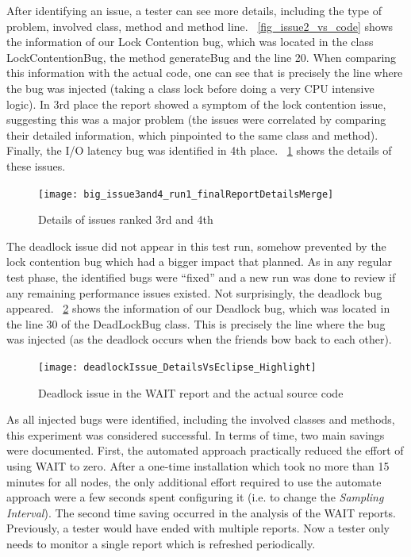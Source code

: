 \documentclass[runningheads,a4paper]{llncs}
\begin{document}
After identifying an issue, a tester can see more details, including the type of
problem, involved class, method and method line. \figurename
~\ref{fig_issue2_vs_code} shows the information of our Lock Contention bug,
which was located in the class LockContentionBug, the method generateBug and the
line 20. When comparing this information with the actual code, one can see that
is precisely the line where the bug was injected (taking a class lock before
doing a very CPU intensive logic). In 3rd place the report showed a symptom of
the lock contention issue, suggesting this was a major problem (the issues were correlated 
by comparing their detailed information, which pinpointed to the same class and
method). Finally, the I/O latency bug was identified in 4th place. \figurename
~\ref{fig_issues34} shows the details of these issues.

\begin{figure}[!h]
\centering
\texttt{[image: big\_issue3and4\_run1\_finalReportDetailsMerge]}
\caption{Details of issues ranked 3rd and 4th}
\label{fig_issues34}
\end{figure}

The deadlock issue did not appear in this test run, somehow prevented by the
lock contention bug which had a bigger impact that planned. As in any regular
test phase, the identified bugs were ``fixed'' and a new run was done to review
if any remaining performance issues existed. Not surprisingly, the deadlock bug
appeared. \figurename ~\ref{fig_dlissue_vs_code} shows the information of our
Deadlock bug, which was located in the line 30 of the DeadLockBug class. This is
precisely the line where the bug was injected (as the deadlock occurs when the
friends bow back to each other).
\vspace{-5pt}
\begin{figure}[!h]
\centering
\texttt{[image: deadlockIssue\_DetailsVsEclipse\_Highlight]}
\caption{Deadlock issue in the WAIT report and the actual source code}
\label{fig_dlissue_vs_code}
\end{figure}
\vspace{-5pt}

As all injected bugs were identified, including the involved classes and
methods, this experiment was considered successful. In terms of time, two main
savings were documented. First, the automated approach practically reduced the
effort of using WAIT to zero. After a one-time installation which took no more
than 15 minutes for all nodes, the only additional effort required to use the
automate approach were a few seconds spent configuring it (i.e. to change the
\emph{Sampling Interval}). The second time saving occurred in the analysis of the WAIT reports. Previously, a tester would have ended with multiple reports. Now a tester only needs to monitor a single report which is 
refreshed periodically.
\end{document}

